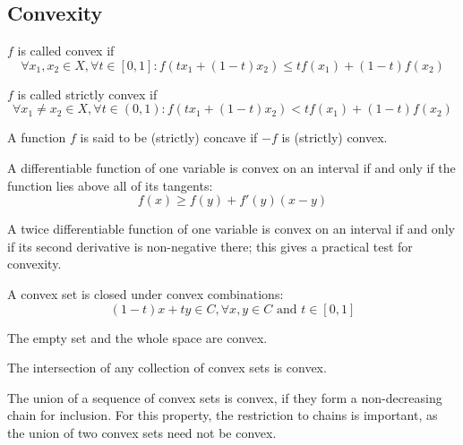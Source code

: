 \documentclass[12pt]{article}
\begin{document}
\subsection{Convexity}
\ulb
\item $f$ is called convex if
\[ \forall x_1,x_2 \in X, \forall t \in [0,1]: f(tx_1 + (1-t)x_2) \leq tf(x_1) + (1-t)f(x_2) \]
\item $f$ is called strictly convex if
\[ \forall x_1 \neq x_2 \in X, \forall t \in (0,1): f(tx_1 + (1-t)x_2) < tf(x_1) + (1-t)f(x_2) \]
\item A function $f$ is said to be (strictly) concave if $-f$ is (strictly) convex.
\item A differentiable function of one variable is convex on an interval if and only if the function lies above all of its tangents:
\[ f(x) \geq f(y) + f'(y)(x-y) \]
\item A twice differentiable function of one variable is convex on an interval if and only if its second derivative is non-negative there; this gives a practical test for convexity.
\item A convex set is closed under convex combinations:
\[ (1-t)x + ty \in C, \forall x,y \in C \text{ and } t\in [0,1] \]
\ulb
\item The empty set and the whole space are convex.
\item The intersection of any collection of convex sets is convex.
\item The union of a sequence of convex sets is convex, if they form a non-decreasing chain for inclusion. For this property, the restriction to chains is important, as the union of two convex sets need not be convex.
\ule
\ule
\end{document}
